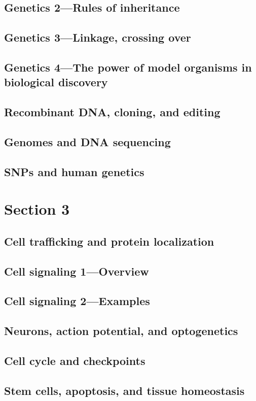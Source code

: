 \documentclass[../introbio.tex]{subfiles}
\begin{document}
\section{Genetics 2—Rules of inheritance}
\section{Genetics 3—Linkage, crossing over}
\section{Genetics 4—The power of model organisms in biological discovery}
\section{Recombinant DNA, cloning, and editing}
\section{Genomes and DNA sequencing}
\section{SNPs and human genetics}
\chapter{Section 3}
\section{Cell trafficking and protein localization}
\section{Cell signaling 1—Overview}
\section{Cell signaling 2—Examples}
\section{Neurons, action potential, and optogenetics}
\section{Cell cycle and checkpoints}
\section{Stem cells, apoptosis, and tissue homeostasis}
\end{document}
